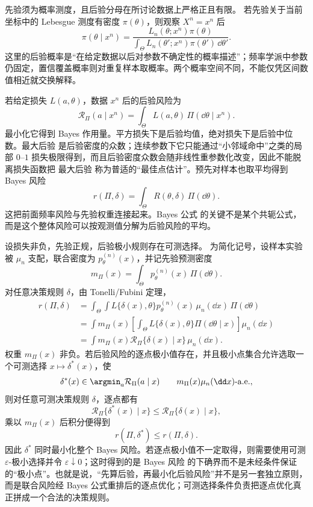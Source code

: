 \begin{definition}[后验概率]
先验须为概率测度，且后验分母在所讨论数据上严格正且有限。
若先验关于当前坐标中的 Lebesgue 测度有密度 $\pi(\theta)$，则观察 $X^n=x^n$ 后
\begin{equation}\label{eq:math-stat-bayes-posterior}
 \pi(\theta\mid x^n)
 =\frac{L_n(\theta;x^n)\pi(\theta)}
 {\int_\Theta L_n(\theta';x^n)\pi(\theta')\,\dd\theta'}.
\end{equation}
这里的后验概率是“在给定数据以后对参数不确定性的概率描述”；频率学派中参数仍固定，置信覆盖概率则对重复样本取概率。两个概率空间不同，不能仅凭区间数值相近就交换解释。
\end{definition}

\begin{definition}
若给定损失 $L(a,\theta)$，数据 $x^n$ 后的后验风险为
\[
 \mathcal R_\Pi(a\mid x^n)
 =\int_\Theta L(a,\theta)\,\Pi(\dd\theta\mid x^n).
\]
最小化它得到 Bayes 作用量。平方损失下是后验均值，绝对损失下是后验中位数。最大后验 是后验密度的众数；连续参数下它只能通过“小邻域命中”之类的局部 $0$--$1$ 损失极限得到，而且后验密度众数会随非线性重参数化改变，因此不能脱离损失函数把 最大后验 称为普适的“最佳点估计”。预先对样本也取平均得到 Bayes 风险
\[
 r(\Pi,\delta)
 =\int_\Theta R(\theta,\delta)\,\Pi(\dd\theta).
\]
这把前面频率风险与先验权重连接起来。Bayes 公式 的关键不是某个共轭公式，而是这个整体风险可以按观测值分解为后验风险的平均。
\end{definition}

\begin{proposition}[逐点后验最优化最小化整体风险]
设损失非负，先验正规，后验极小规则存在可测选择。
为简化记号，设样本实验被 $\mu_n$ 支配，联合密度为 $p_\theta^{(n)}(x)$，并记先验预测密度
\[
 m_\Pi(x)
 =\int_\Theta p_\theta^{(n)}(x)\,\Pi(\dd\theta).
\]
对任意决策规则 $\delta$，由 Tonelli/Fubini 定理，
\begin{align*}
 r(\Pi,\delta)
 &=\int_\Theta\int
 L\{\delta(x),\theta\}
 p_\theta^{(n)}(x)\,\mu_n(\dd x)\,\Pi(\dd\theta)\\
 &=\int m_\Pi(x)
 \left[
 \int_\Theta L\{\delta(x),\theta\}
 \Pi(\dd\theta\mid x)
 \right]\mu_n(\dd x)\\
 &=\int m_\Pi(x)
 \mathcal R_\Pi\{\delta(x)\mid x\}
 \,\mu_n(\dd x).
\end{align*}
权重 $m_\Pi(x)$ 非负。若后验风险的逐点极小值存在，并且极小点集合允许选取一个可测选择 $x\mapsto\delta^*(x)$，使
\[
 \delta^*(x)
 \in\argmin_a\mathcal R_\Pi(a\mid x)
 \qquad m_\Pi(x)\mu_n(\dd x)\text{-a.e.},
\]
则对任意可测决策规则 $\delta$，逐点都有
\[
 \mathcal R_\Pi\{\delta^*(x)\mid x\}
 \le
 \mathcal R_\Pi\{\delta(x)\mid x\},
\]
乘以 $m_\Pi(x)$ 后积分便得到
\[
 r(\Pi,\delta^*)\le r(\Pi,\delta).
\]
因此 $\delta^*$ 同时最小化整个 Bayes 风险。若逐点极小值不一定取得，则需要使用可测 $\varepsilon$-极小选择并令 $\varepsilon\downarrow0$；这时得到的是 Bayes 风险 的下确界而不是未经条件保证的“极小点”。也就是说，“先算后验，再最小化后验风险”并不是另一套独立原则，而是联合风险经 Bayes 公式重排后的逐点优化；可测选择条件负责把逐点优化真正拼成一个合法的决策规则。
\end{proposition}

